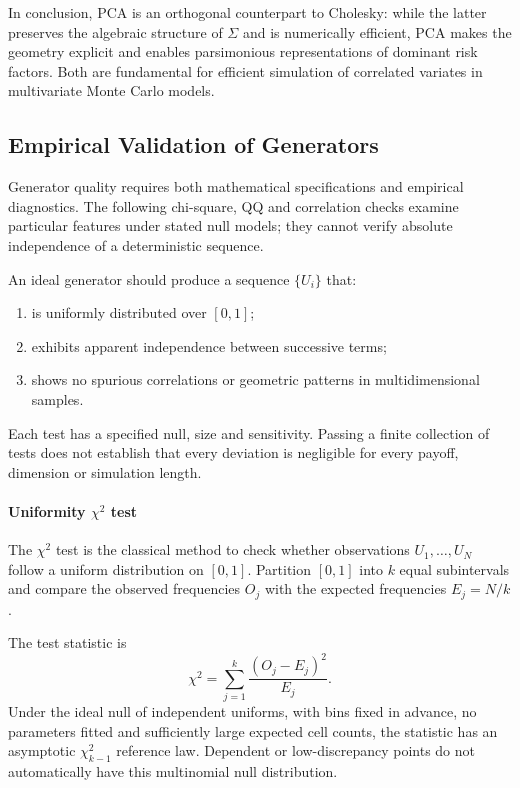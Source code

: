 \bigskip
\noindent
In conclusion, PCA is an orthogonal counterpart to Cholesky:
while the latter preserves the algebraic structure of \(\Sigma\) and is numerically efficient, 
PCA makes the geometry explicit and enables parsimonious representations of dominant risk factors. 
Both are fundamental for efficient simulation of correlated variates in multivariate Monte Carlo models.
\subsection{Empirical Validation of Generators} 

Generator quality requires both mathematical specifications and
empirical diagnostics. The following chi-square, QQ and correlation
checks examine particular features under stated null models; they
cannot verify absolute independence of a deterministic sequence.

\begin{remark}
An ideal generator should produce a sequence \(\{U_i\}\) that:
\begin{enumerate}
    \item is uniformly distributed over \([0,1]\);
    \item exhibits apparent independence between successive terms;
    \item shows no spurious correlations or geometric patterns in multidimensional samples.
\end{enumerate}
Each test has a specified null, size and sensitivity. Passing a
finite collection of tests does not establish that every deviation is
negligible for every payoff, dimension or simulation length.
\end{remark}
\paragraph{Uniformity $\chi^2$ test}

The $\chi^2$ test is the classical method to check whether observations \(U_1, \dots, U_N\) follow a uniform distribution on \([0,1]\).
Partition \([0,1]\) into \(k\) equal subintervals and compare the observed frequencies \(O_j\) with the expected frequencies \(E_j = N/k\).

\begin{definition}
The test statistic is
\[
\chi^2 = \sum_{j=1}^{k} \frac{(O_j - E_j)^2}{E_j}.
\]
Under the ideal null of independent uniforms, with bins fixed in
advance, no parameters fitted and sufficiently large expected cell
counts, the statistic has an asymptotic $\chi^2_{k-1}$ reference law.
Dependent or low-discrepancy points do not automatically have this
multinomial null distribution.
\end{definition}

